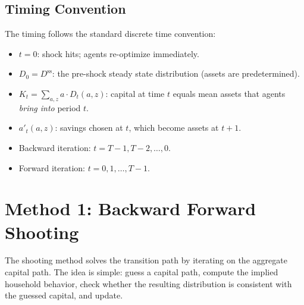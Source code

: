 \documentclass[12pt]{article}
\begin{document}
\subsection{Timing Convention}

The timing follows the standard discrete time convention:
\begin{itemize}[nosep]
    \item $t = 0$: shock hits; agents re-optimize immediately.
    \item $D_0 = D^{\text{ss}}$: the pre-shock steady state distribution (assets are predetermined).
    \item $K_t = \sum_{a,z} a \cdot D_t(a,z)$: capital at time $t$ equals mean assets that agents \emph{bring into} period $t$.
    \item $a'_t(a,z)$: savings chosen at $t$, which become assets at $t+1$.
    \item Backward iteration: $t = T-1, T-2, \ldots, 0$.
    \item Forward iteration: $t = 0, 1, \ldots, T-1$.
\end{itemize}

\section{Method 1: Backward Forward Shooting}
\label{sec:shooting}

The shooting method solves the transition path by iterating on the aggregate capital path. The idea is simple: guess a capital path, compute the implied household behavior, check whether the resulting distribution is consistent with the guessed capital, and update.
\end{document}
